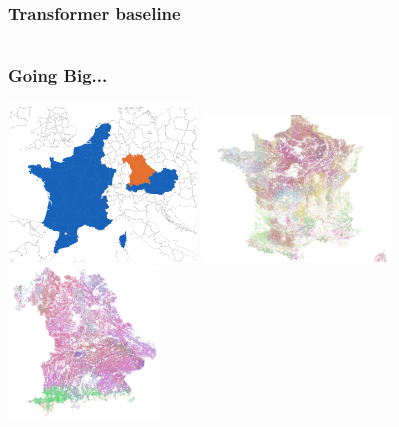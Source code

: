 \documentclass[%
  aspectratio=169,
  9pt,
  USenglish,
  titlegraphic, %
  affiliationintitlepagehead,
  affiliation,
]{beamer}
\begin{document}
\begin{frame}
\frametitle{Transformer baseline}



\begin{columns}



\end{columns}

\end{frame}


\begin{frame}
\frametitle{Going Big...}

\includegraphics[width=5cm]{images/EuroCrops}
\includegraphics[width=5cm]{images/France}
\includegraphics[width=4cm]{images/Bavaria}

\end{frame}
\end{document}
